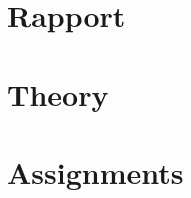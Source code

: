 \documentclass[12pt,a4paper,twoside,openright]{report}
\begin{document}


\newpage


\newpage
%

\tableofcontents

\newpage

\chapter{Rapport}



\chapter{Theory}

\setcounter{page}{1}



\chapter{Assignments}



\appendix



\newpage
\printbibliography
\newpage
\printindex
\end{document}
